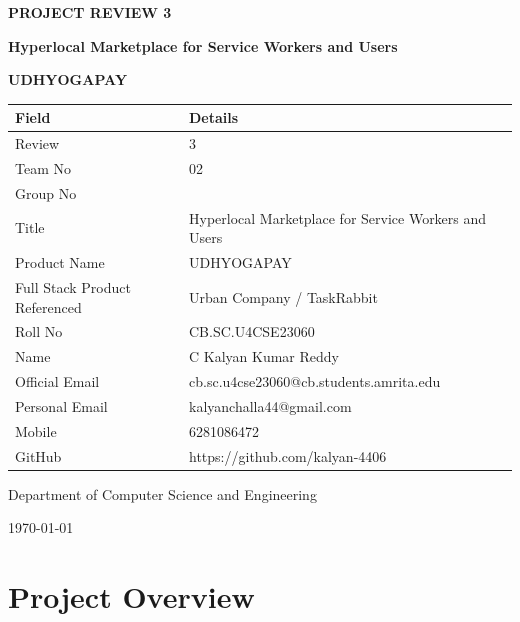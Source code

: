 \documentclass[12pt,a4paper]{article}
\begin{document}
\begin{titlepage}
    \centering
    \vspace*{2cm}
    
    {\Huge\bfseries PROJECT REVIEW 3\par}
    \vspace{1cm}
    {\LARGE\bfseries Hyperlocal Marketplace for Service Workers and Users\par}
    \vspace{0.5cm}
    {\Large\textbf{UDHYOGAPAY}\par}
    
    \vspace{2cm}
    
    \begin{tabular}{|p{5cm}|p{8cm}|}
    \hline
    \rowcolor{lightgray}
    \textbf{Field} & \textbf{Details} \\
    \hline
    Review & 3 \\
    \hline
    Team No & 02 \\
    \hline
    Group No & ~~ \\
    \hline
    Title & Hyperlocal Marketplace for Service Workers and Users \\
    \hline
    Product Name & UDHYOGAPAY \\
    \hline
    Full Stack Product Referenced & Urban Company / TaskRabbit \\
    \hline
    Roll No & CB.SC.U4CSE23060 \\
    \hline
    Name & C Kalyan Kumar Reddy \\
    \hline
    Official Email & cb.sc.u4cse23060@cb.students.amrita.edu \\
    \hline
    Personal Email & kalyanchalla44@gmail.com \\
    \hline
    Mobile & 6281086472 \\
    \hline
    GitHub & https://github.com/kalyan-4406 \\
    \hline
    \end{tabular}
    
    \vfill
    
    {\large Department of Computer Science and Engineering\par}
    {\large \today\par}
\end{titlepage}

\newpage

\section*{Project Overview}
\end{document}

